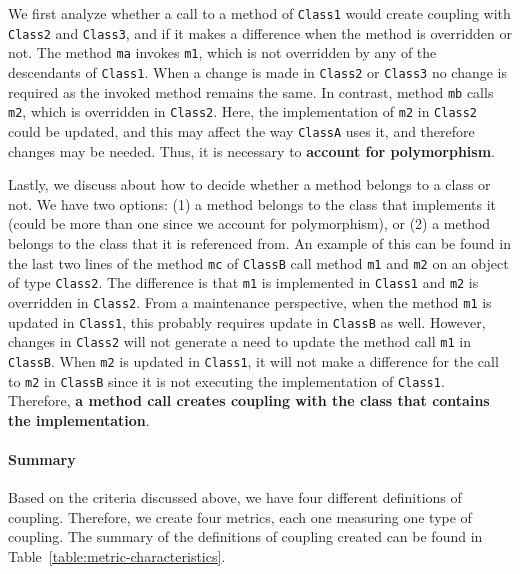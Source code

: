 We first analyze whether a call to a method of \texttt{Class1} would create coupling with \texttt{Class2} and \texttt{Class3}, and if it makes a difference when the method is overridden or not. The method \texttt{ma} invokes \texttt{m1}, which is not overridden by any of the descendants of \texttt{Class1}. When a change is made in \texttt{Class2} or \texttt{Class3} no change is required as the invoked method remains the same. In contrast, method \texttt{mb} calls \texttt{m2}, which is overridden in \texttt{Class2}. Here, the implementation of \texttt{m2} in \texttt{Class2} could be updated, and this may affect the way \texttt{ClassA} uses it, and therefore changes may be needed. Thus, it is necessary to \textbf{account for polymorphism}.

Lastly, we discuss about how to decide whether a method belongs to a class or not. We have two options: (1) a method belongs to the class that implements it (could be more than one since we account for polymorphism), or (2) a method belongs to the class that it is referenced from. An example of this can be found in the last two lines of the method \texttt{mc} of \texttt{ClassB} call method \texttt{m1} and \texttt{m2} on an object of type \texttt{Class2}. The difference is that \texttt{m1} is implemented in \texttt{Class1} and \texttt{m2} is overridden in \texttt{Class2}. From a maintenance perspective, when the method \texttt{m1} is updated in \texttt{Class1}, this probably requires update in \texttt{ClassB} as well. However, changes in \texttt{Class2} will not generate a need to update the method call \texttt{m1} in \texttt{ClassB}. When \texttt{m2} is updated in \texttt{Class1}, it will not make a difference for the call to \texttt{m2} in \texttt{ClassB} since it is not executing the implementation of \texttt{Class1}. Therefore, \textbf{a method call creates coupling with the class that contains the implementation}.

\paragraph{Summary}
Based on the criteria discussed above, we have four different definitions of coupling. Therefore, we create four metrics, each one measuring one type of coupling. The summary of the definitions of coupling created can be found in Table~\ref{table:metric-characteristics}.

